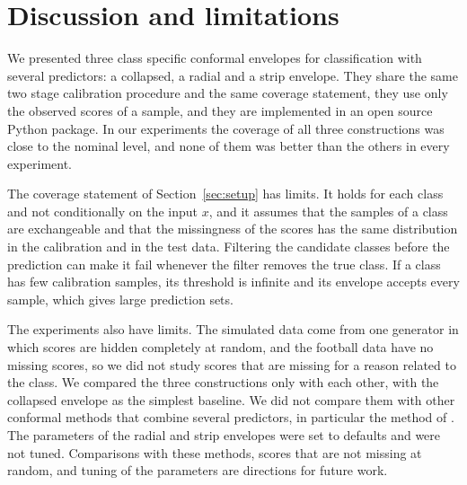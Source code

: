 \section{Discussion and limitations}\label{sec:discussion}

We presented three class specific conformal envelopes for classification with several predictors: a collapsed, a radial 
and a strip envelope. They share the same two stage calibration procedure and the same coverage statement, they use only the 
observed scores of a sample, and they are implemented in an open source Python package. In our experiments the coverage 
of all three constructions was close to the nominal level, and none of them was better than the others in every experiment.

The coverage statement of Section~\ref{sec:setup} has limits. It holds for each class and not conditionally on the input 
$x$, and it assumes that the samples of a class are exchangeable and that the missingness of the scores has the same 
distribution in the calibration and in the test data. Filtering the candidate classes before the prediction can make it 
fail whenever the filter removes the true class. If a class has few calibration samples, its threshold is infinite and 
its envelope accepts every sample, which gives large prediction sets. 

The experiments also have limits. The simulated data come from one generator in which scores are hidden completely at 
random, and the football data have no missing scores, so we did not study scores that are missing for a reason related 
to the class. We compared the three constructions only with each other, with the collapsed envelope as the simplest 
baseline. We did not compare them with other conformal methods that combine several predictors, in particular the method 
of \citet{ochoarivera2024conformal}. The parameters of the radial and strip envelopes were set to defaults and were not 
tuned. Comparisons with these methods, scores that are not missing at random, and tuning of the parameters are directions 
for future work.